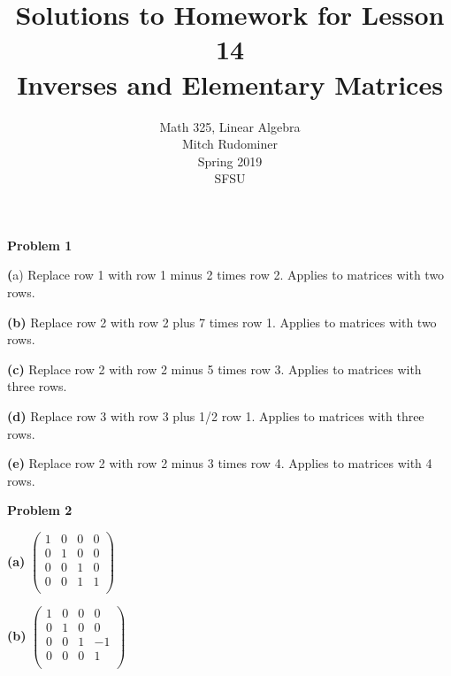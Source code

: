 \documentclass[oneside,12pt]{amsart}
\begin{document}
\title{Solutions to Homework for Lesson 14 \\ Inverses and Elementary Matrices}
\author{Math 325, Linear Algebra \\ Mitch Rudominer \\ Spring 2019 \\ SFSU }
\date{}

\maketitle


\textbf{Problem 1}

\bigskip

\textbf(a) Replace row 1 with row 1 minus 2 times row 2. Applies to matrices
with two rows.

\bigskip

\textbf{(b)} Replace row 2 with row 2 plus 7 times row 1. Applies to matrices
with two rows.

\bigskip

\textbf{(c)} Replace row 2 with row 2 minus 5 times row 3. Applies to matrices
with three rows.

\bigskip

\textbf{(d)} Replace row 3 with row 3 plus 1/2 row 1. Applies to matrices
with three rows.

\bigskip

\textbf{(e)} Replace row 2 with row 2 minus 3 times row 4. Applies to
matrices with 4 rows.

\bigskip

\textbf{Problem 2}

\bigskip

\textbf{(a)}
$
\begin{pmatrix}
1 & 0 & 0 & 0 \\
0 & 1 & 0 & 0 \\
0 & 0 & 1 & 0 \\
0 & 0 & 1 & 1 \\
\end{pmatrix}
$

\bigskip

\textbf{(b)}
$
\begin{pmatrix}
1 & 0 & 0 & 0 \\
0 & 1 & 0 & 0 \\
0 & 0 & 1 & -1 \\
0 & 0 & 0 & 1 \\
\end{pmatrix}
$

\bigskip
\end{document}
